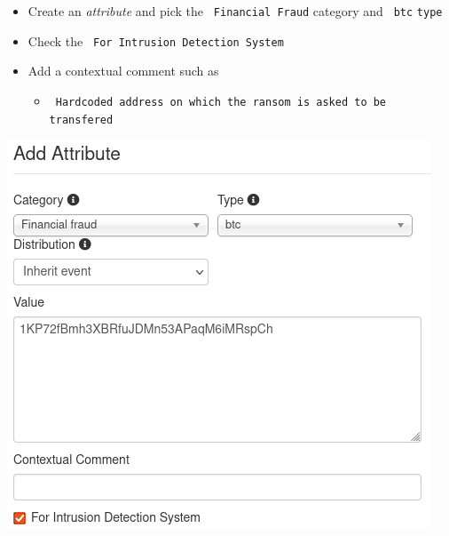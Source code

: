 \begin{frame}
    \begin{itemize}
        \item Create an \textit{attribute} and pick the \texttt{\color{black} Financial Fraud} category and \texttt{\color{black} btc}  \texttt{type}
        \item Check the \texttt{\color{black} For Intrusion Detection System}
        \item Add a contextual comment such as
        \begin{itemize}
            \item \texttt{\color{black} Hardcoded address on which the ransom is asked to be transfered}
        \end{itemize}
    \end{itemize}
    \begin{center}
        \includegraphics[width=0.47\linewidth]{pictures/case2/attribute-btc.png}
    \end{center}
\end{frame}

